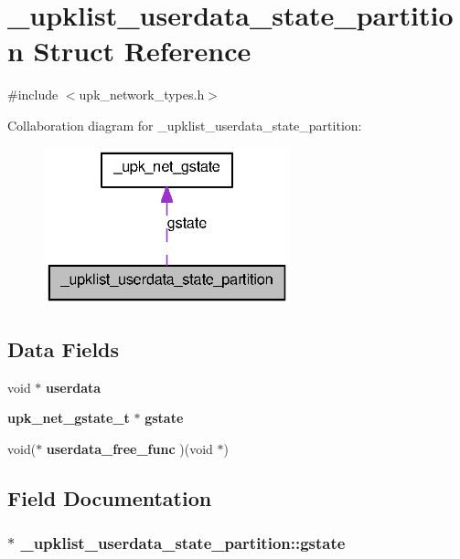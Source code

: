 \section{\_\-upklist\_\-userdata\_\-state\_\-partition Struct Reference}
\label{struct__upklist__userdata__state__partition}


{\ttfamily \#include $<$upk\_\-network\_\-types.h$>$}



Collaboration diagram for \_\-upklist\_\-userdata\_\-state\_\-partition:\nopagebreak
\begin{figure}[H]
\begin{center}
\leavevmode
\includegraphics[width=202pt]{struct__upklist__userdata__state__partition__coll__graph}
\end{center}
\end{figure}
\subsection*{Data Fields}
\begin{DoxyCompactItemize}
\item 
void $\ast$ {\bf userdata}
\item 
{\bf upk\_\-net\_\-gstate\_\-t} $\ast$ {\bf gstate}
\item 
void($\ast$ {\bf userdata\_\-free\_\-func} )(void $\ast$)
\end{DoxyCompactItemize}


\subsection{Field Documentation}
\subsubsection[{gstate}]{$\ast$ {\bf \_\-upklist\_\-userdata\_\-state\_\-partition::gstate}}\label{struct__upklist__userdata__state__partition_a2ef497decdcdf48f741a48860ab938f6}


